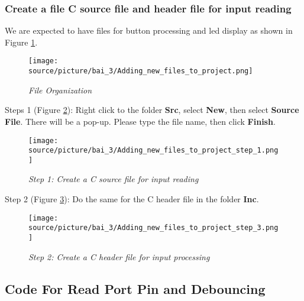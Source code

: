\subsubsection{Create a file C source file and header file for input reading}
We are expected to have files for button processing and led display as shown in Figure \ref{bai4_pic_Adding_new_files_to_project}.

\begin{figure}[!htp]
    \centering
    \texttt{[image: source/picture/bai\_3/Adding\_new\_files\_to\_project.png]}
    \caption{\textit{File Organization}}
    \label{bai4_pic_Adding_new_files_to_project}
\end{figure}

Steps 1 (Figure \ref{bai4_pic_Adding_new_files_to_project_step_1}): Right click to the folder \textbf{Src}, select \textbf{New}, then select \textbf{Source File}. There will be a pop-up. Please type the file name, then click \textbf{Finish}.
\begin{figure}[!htp]
    \centering
    \texttt{[image: source/picture/bai\_3/Adding\_new\_files\_to\_project\_step\_1.png]}
    \caption{\textit{Step 1: Create a C source file for input reading}}
    \label{bai4_pic_Adding_new_files_to_project_step_1}
\end{figure}

Step 2 (Figure \ref{bai4_pic_Adding_new_files_to_project_step_3}): Do the same for the C header file in the folder \textbf{Inc}.
\begin{figure}[!htp]
    \centering
    \texttt{[image: source/picture/bai\_3/Adding\_new\_files\_to\_project\_step\_3.png]}
    \caption{\textit{Step 2: Create a C header file for input processing}}
    \label{bai4_pic_Adding_new_files_to_project_step_3}
\end{figure}


\newpage

\newpage
\subsection{Code For Read Port Pin and Debouncing}
